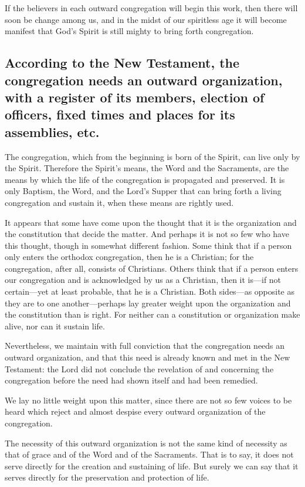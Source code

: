 If the believers in each outward congregation will begin this work, then there will soon be change among us, and in the midst of our spiritless age it will become manifest that God’s Spirit is still mighty to bring forth congregation.




\subsection{According to the New Testament, the congregation needs an outward organization, with a register of its members, election of officers, fixed times and places for its assemblies, etc.}

The congregation, which from the beginning is born of the Spirit, can live only by the Spirit. Therefore the Spirit’s means, the Word and the Sacraments, are the means by which the life of the congregation is propagated and preserved. It is only Baptism, the Word, and the Lord’s Supper that can bring forth a living congregation and sustain it, when these means are rightly used.

It appears that some have come upon the thought that it is the organization and the constitution that decide the matter. And perhaps it is not so few who have this thought, though in somewhat different fashion. Some think that if a person only enters the orthodox congregation, then he is a Christian; for the congregation, after all, consists of Christians. Others think that if a person enters our congregation and is acknowledged by us as a Christian, then it is—if not certain—yet at least probable, that he is a Christian. Both sides—as opposite as they are to one another—perhaps lay greater weight upon the organization and the constitution than is right. For neither can a constitution or organization make alive, nor can it sustain life.

Nevertheless, we maintain with full conviction that the congregation needs an outward organization, and that this need is already known and met in the New Testament: the Lord did not conclude the revelation of and concerning the congregation before the need had shown itself and had been remedied.

We lay no little weight upon this matter, since there are not so few voices to be heard which reject and almost despise every outward organization of the congregation.

The necessity of this outward organization is not the same kind of necessity as that of grace and of the Word and of the Sacraments. That is to say, it does not serve directly for the creation and sustaining of life. But surely we can say that it serves directly for the preservation and protection of life.

